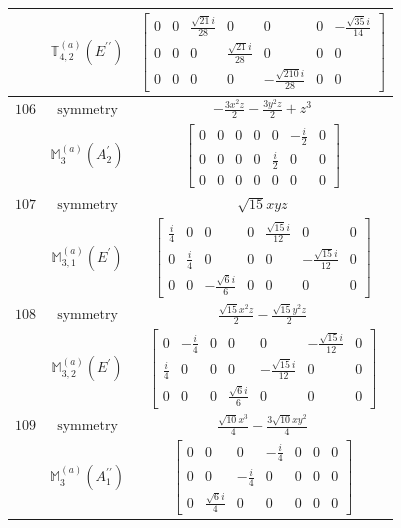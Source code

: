 \documentclass[fleqn,8pt,landscape]{jsarticle}
\begin{document}
\begin{longtable}{ccc}
$  $ & $ \mathbb{T}_{4,2}^{(a)}(E^{\prime\prime}) $ & $ \begin{bmatrix} 0 & 0 & \frac{\sqrt{21} i}{28} & 0 & 0 & 0 & - \frac{\sqrt{35} i}{14} \\ 0 & 0 & 0 & \frac{\sqrt{21} i}{28} & 0 & 0 & 0 \\ 0 & 0 & 0 & 0 & - \frac{\sqrt{210} i}{28} & 0 & 0 \end{bmatrix} $ \\ \hline
$ 106 $ & $ \text{symmetry} $ & $ - \frac{3 x^{2} z}{2} - \frac{3 y^{2} z}{2} + z^{3} $ \\
$  $ & $ \mathbb{M}_{3}^{(a)}(A_{2}^{\prime}) $ & $ \begin{bmatrix} 0 & 0 & 0 & 0 & 0 & - \frac{i}{2} & 0 \\ 0 & 0 & 0 & 0 & \frac{i}{2} & 0 & 0 \\ 0 & 0 & 0 & 0 & 0 & 0 & 0 \end{bmatrix} $ \\ \hline
$ 107 $ & $ \text{symmetry} $ & $ \sqrt{15} x y z $ \\
$  $ & $ \mathbb{M}_{3,1}^{(a)}(E^{\prime}) $ & $ \begin{bmatrix} \frac{i}{4} & 0 & 0 & 0 & \frac{\sqrt{15} i}{12} & 0 & 0 \\ 0 & \frac{i}{4} & 0 & 0 & 0 & - \frac{\sqrt{15} i}{12} & 0 \\ 0 & 0 & - \frac{\sqrt{6} i}{6} & 0 & 0 & 0 & 0 \end{bmatrix} $ \\ \hline
$ 108 $ & $ \text{symmetry} $ & $ \frac{\sqrt{15} x^{2} z}{2} - \frac{\sqrt{15} y^{2} z}{2} $ \\
$  $ & $ \mathbb{M}_{3,2}^{(a)}(E^{\prime}) $ & $ \begin{bmatrix} 0 & - \frac{i}{4} & 0 & 0 & 0 & - \frac{\sqrt{15} i}{12} & 0 \\ \frac{i}{4} & 0 & 0 & 0 & - \frac{\sqrt{15} i}{12} & 0 & 0 \\ 0 & 0 & 0 & \frac{\sqrt{6} i}{6} & 0 & 0 & 0 \end{bmatrix} $ \\ \hline
$ 109 $ & $ \text{symmetry} $ & $ \frac{\sqrt{10} x^{3}}{4} - \frac{3 \sqrt{10} x y^{2}}{4} $ \\
$  $ & $ \mathbb{M}_{3}^{(a)}(A_{1}^{\prime\prime}) $ & $ \begin{bmatrix} 0 & 0 & 0 & - \frac{i}{4} & 0 & 0 & 0 \\ 0 & 0 & - \frac{i}{4} & 0 & 0 & 0 & 0 \\ 0 & \frac{\sqrt{6} i}{4} & 0 & 0 & 0 & 0 & 0 \end{bmatrix} $ \\ \hline

\end{longtable}
\end{document}

